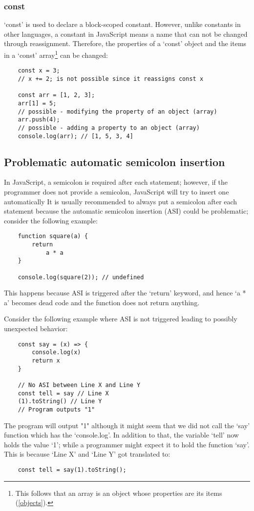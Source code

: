 \documentclass[11pt,a4paper]{article}
\begin{document}
\subsubsection{const}
`const' is used to declare a block-scoped constant.
However, unlike constants in other languages,
a constant in JavaScript means a name that can not be changed through reassignment.
Therefore, the properties of a `const' object and the items in a `const'
array\footnote{This follows that an array is an object whose properties are its items (\ref{objects}).}
can be changed:
\begin{verbatim}
    const x = 3;
    // x += 2; is not possible since it reassigns const x

    const arr = [1, 2, 3];
    arr[1] = 5;
    // possible - modifying the property of an object (array)
    arr.push(4);
    // possible - adding a property to an object (array)
    console.log(arr); // [1, 5, 3, 4]
\end{verbatim}

\subsection{Problematic automatic semicolon insertion}
In JavaScript, a semicolon is required after each statement; however,
if the programmer does not provide a semicolon, JavaScript will try to insert one automatically
It is usually recommended to always put a semicolon after each statement because
the automatic semicolon insertion (ASI) could be problematic; consider the following example:
\begin{verbatim}
    function square(a) {
        return
            a * a
    }

    console.log(square(2)); // undefined
\end{verbatim}
This happens because ASI is triggered after the `return' keyword,
and hence `a * a' becomes dead code and the function does not return anything.

Consider the following example where ASI is not triggered leading to possibly unexpected behavior:
\begin{verbatim}
    const say = (x) => {
        console.log(x)
        return x
    }

    // No ASI between Line X and Line Y
    const tell = say // Line X
    (1).toString() // Line Y
    // Program outputs "1"
\end{verbatim}
The program will output "1" although it might seem that we did not call the `say' function which has the `console.log'.
In addition to that, the variable `tell' now holds the value `1';
while a programmer might expect it to hold the function `say'.
This is because `Line X' and `Line Y' got translated to:
\begin{verbatim}
    const tell = say(1).toString();
\end{verbatim}
\end{document}
